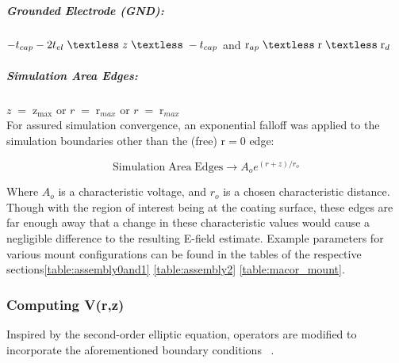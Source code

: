 \subparagraph*{Grounded Electrode (GND):}
$ -t_{cap} -2t_{el} \; \textless \; z \; \textless \; -t_{cap} $ and $\mathrm{r}_{ap} \; \textless \;\mathrm{r} \; \textless \;\mathrm{r}_{d} $

\subparagraph*{Simulation Area Edges:}
$ z \; = \;\mathrm{z}_\mathrm{max} $ or  $r \; = \;\mathrm{r}_{max}$ or  $r \; = \;\mathrm{r}_{max}$ 
\\

\noindent For assured simulation convergence, an exponential falloff was applied to the simulation boundaries other than the (free) $\mathrm{r} = 0$ edge:

\begin{equation}
    \mathrm{Simulation \; Area \; Edges} \rightarrow A_o e^{(r+z)/r_o}
\end{equation}

Where $A_o$ is a characteristic voltage, and $r_o$ is a chosen characteristic distance. Though with the region of interest being at the coating surface, these edges are far enough away that a change in these characteristic values would cause a negligible difference to the resulting E-field estimate. Example parameters for various mount configurations can be found in the tables of the respective sections\autoref{table:assembly0and1} \autoref{table:assembly2} \autoref{table:macor_mount}.
\subsubsection*{Computing V(r,z)}

Inspired by the second-order elliptic equation, operators are modified to incorporate the aforementioned boundary conditions ~\cite{Press:2007}.

\iffalse


